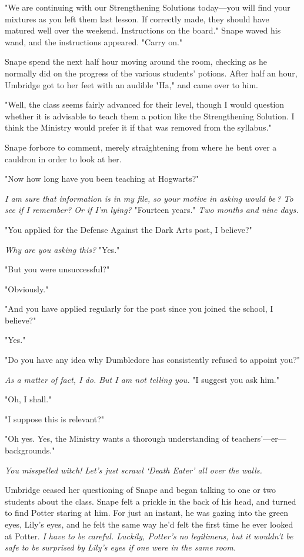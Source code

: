 "We are continuing with our Strengthening Solutions today—you will find your mixtures as you left them last lesson. If correctly made, they should have matured well over the weekend. Instructions on the board." Snape waved his wand, and the instructions appeared. "Carry on."

Snape spend the next half hour moving around the room, checking as he normally did on the progress of the various students' potions. After half an hour, Umbridge got to her feet with an audible "Ha," and came over to him.

"Well, the class seems fairly advanced for their level, though I would question whether it is advisable to teach them a potion like the Strengthening Solution. I think the Ministry would prefer it if that was removed from the syllabus."

Snape forbore to comment, merely straightening from where he bent over a cauldron in order to look at her.

"Now{\el} how long have you been teaching at Hogwarts?"

\emph{I am sure that information is in my file, so your motive in asking would be{\el}\,? To see if I remember? Or if I'm lying?} "Fourteen years." \emph{Two months and nine days.}

"You applied for the Defense Against the Dark Arts post, I believe?"

\emph{Why are you asking this?} "Yes."

"But you were unsuccessful?"

"Obviously."

"And you have applied regularly for the post since you joined the school, I believe?"

"Yes."

"Do you have any idea why Dumbledore has consistently refused to appoint you?"

\emph{As a matter of fact, I do. But I am not telling you.} "I suggest you ask him."

"Oh, I shall."

"I suppose this is relevant?"

"Oh yes. Yes, the Ministry wants a thorough understanding of teachers'—er—backgrounds."

\emph{You misspelled witch! Let's just scrawl `Death Eater' all over the walls.}

Umbridge ceased her questioning of Snape and began talking to one or two students about the class. Snape felt a prickle in the back of his head, and turned to find Potter staring at him. For just an instant, he was gazing into the green eyes, Lily's eyes, and he felt the same way he'd felt the first time he ever looked at Potter. \emph{I have to be careful. Luckily, Potter's no legilimens, but it wouldn't be safe to be surprised by Lily's eyes if one were in the same room.}

